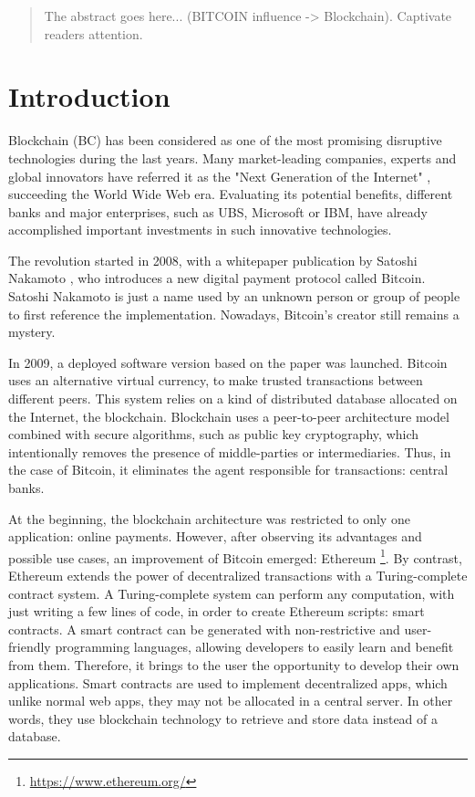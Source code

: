 \begin{abstract}
 The abstract goes here... (BITCOIN influence -> Blockchain). Captivate readers attention.
\end{abstract}




\chapter{Introduction}

Blockchain (BC) has been considered as one of the most promising disruptive technologies during the last years. Many market-leading companies, experts and global innovators have referred it as the "Next Generation of the Internet" \cite{JenClarck2017}, succeeding the World Wide Web era. Evaluating its potential benefits, different banks and major enterprises, such as UBS, Microsoft or IBM, have already accomplished important investments in such innovative technologies.

The revolution started in 2008, with a whitepaper publication by Satoshi Nakamoto \cite{nakamoto2008bitcoin}, who introduces a new digital payment protocol called Bitcoin. Satoshi Nakamoto is just a name used by an unknown person or group of people to first reference the implementation. Nowadays, Bitcoin's creator still remains a mystery.

In 2009, a deployed software version based on the paper was launched. Bitcoin uses an alternative virtual currency, to make trusted transactions between different peers. This system relies on a kind of distributed database allocated on the Internet, the blockchain. Blockchain uses a peer-to-peer architecture model combined with secure algorithms, such as public key cryptography, which intentionally removes the presence of middle-parties or intermediaries. Thus, in the case of Bitcoin, it eliminates the agent responsible for transactions: central banks.

At the beginning, the blockchain architecture was restricted to only one application: online payments. However, after observing its advantages and possible use cases, an improvement of Bitcoin emerged: Ethereum \footnote{\url{https://www.ethereum.org/}}. By contrast, Ethereum extends the power of decentralized transactions with a Turing-complete contract system. A Turing-complete system can perform any computation, with just writing a few lines of code, in order to create Ethereum scripts: smart contracts. A smart contract can be generated with non-restrictive and user-friendly programming languages, allowing developers to easily learn and benefit from them. Therefore, it brings to the user the opportunity to develop their own applications. Smart contracts are used to implement decentralized apps, which unlike normal web apps, they may not be allocated in a central server. In other words, they use blockchain technology to retrieve and store data instead of a database.


